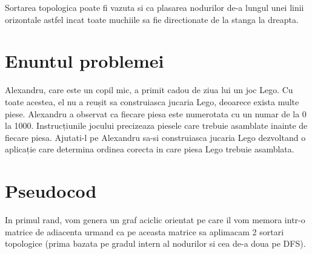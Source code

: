 \documentclass[14pt]{article}
\begin{document}
\vspace{10 mm}

Sortarea topologica poate fi vazuta si ca plasarea nodurilor de-a lungul unei linii orizontale astfel incat toate muchiile sa fie directionate de la stanga la dreapta. 

\newpage
\section*{Enuntul problemei}
Alexandru, care este un copil mic, a primit cadou de ziua lui un joc Lego. Cu toate acestea, el nu a reușit sa construiasca jucaria Lego, deoarece exista multe piese. Alexandru a observat ca fiecare piesa este numerotata cu un numar de la 0 la 1000. Instrucțiunile jocului precizeaza piesele care trebuie asamblate inainte de fiecare piesa. Ajutati-l pe Alexandru sa-si construiasca jucaria Lego dezvoltand o aplicație care determina ordinea corecta in care piesa Lego trebuie asamblata.




\newpage
\section*{Pseudocod}
In primul rand, vom genera un graf aciclic orientat pe care il vom memora intr-o matrice de adiacenta urmand ca pe aceasta matrice sa aplimacam 2 sortari topologice (prima bazata pe gradul intern al nodurilor si cea de-a doua pe DFS).
\end{document}
